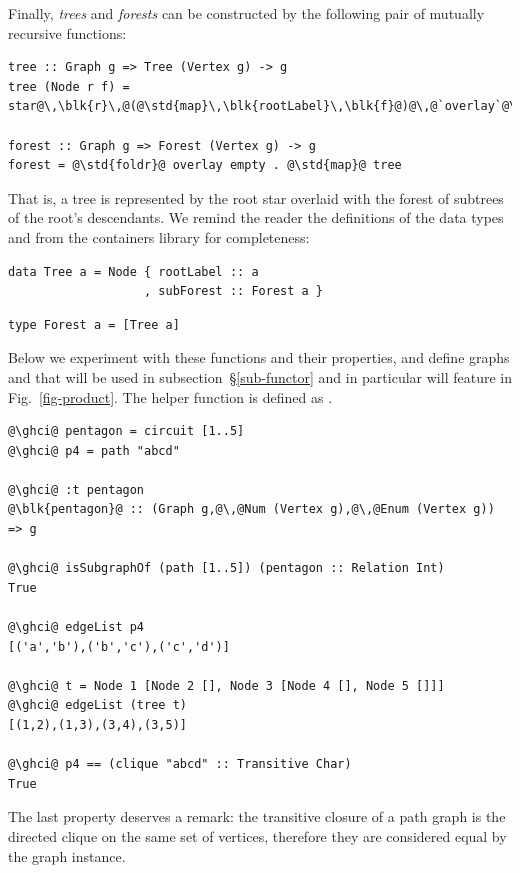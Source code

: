 Finally, \emph{trees} and \emph{forests} can be constructed by the following
pair of mutually recursive functions:

\begin{verbatim}
tree :: Graph g => Tree (Vertex g) -> g
tree (Node r f) = star@\,\blk{r}\,@(@\std{map}\,\blk{rootLabel}\,\blk{f}@)@\,@`overlay`@\,\blk{forest}\,f@

forest :: Graph g => Forest (Vertex g) -> g
forest = @\std{foldr}@ overlay empty . @\std{map}@ tree
\end{verbatim}

\noindent
That is, a tree is represented by the root star overlaid with the forest
of subtrees of the root's descendants. We remind the reader the
definitions of the data types  and  from the
\textsf{containers} library for completeness:

\begin{verbatim}
data Tree a = Node { rootLabel :: a
                   , subForest :: Forest a }
\end{verbatim}
\vspace{-2mm}
\begin{verbatim}
type Forest a = [Tree a]
\end{verbatim}

Below we experiment with these functions and their properties, and define
graphs  and  that will be used in subsection~\S\ref{sub-functor}
and in particular will feature in Fig.~\ref{fig-product}. The helper function
 is defined as .

\begin{verbatim}
@\ghci@ pentagon = circuit [1..5]
@\ghci@ p4 = path "abcd"

@\ghci@ :t pentagon
@\blk{pentagon}@ :: (Graph g,@\,@Num (Vertex g),@\,@Enum (Vertex g)) => g

@\ghci@ isSubgraphOf (path [1..5]) (pentagon :: Relation Int)
True

@\ghci@ edgeList p4
[('a','b'),('b','c'),('c','d')]

@\ghci@ t = Node 1 [Node 2 [], Node 3 [Node 4 [], Node 5 []]]
@\ghci@ edgeList (tree t)
[(1,2),(1,3),(3,4),(3,5)]

@\ghci@ p4 == (clique "abcd" :: Transitive Char)
True
\end{verbatim}

The last property deserves a remark: the transitive closure of a path graph
is the directed clique on the same set of vertices, therefore they are considered equal
by the  graph instance.

